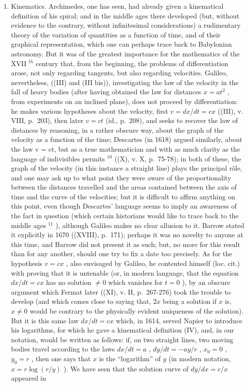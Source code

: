 \begin{enumerate}
\def\labelenumi{\Alph{enumi})}
\setcounter{enumi}{1}
\tightlist
\item
  Kinematics. Archimedes, one has seen, had already given a kinematical definition of his spiral; and in the middle ages there developed (but, without evidence to the contrary, without infinitesimal considerations) a rudimentary theory of the variation of quantities as a function of time, and of their graphical representation, which one can perhaps trace back to Babylonian astronomy. But it was of the greatest importance for the mathematics of the XVII \(^{th}\) century that, from the beginning, the problems of differentiation arose, not only regarding tangents, but also regarding velocities. Galileo, nevertheless, ((III) and (III bis)), investigating the law of the velocity in the fall of heavy bodies (after having obtained the law for distances \(x = at^{2}\) , from experiments on an inclined plane), does not proceed by differentiation: he makes various hypotheses about the velocity, first \(v = dx/dt = cx\) ((III), v. VIII, p.~203), then later \(v = ct\) (id., p.~208), and seeks to recover the law of distances by reasoning, in a rather obscure way, about the graph of the velocity as a function of the time; Descartes (in 1618) argued similarly, about the law v = ct, but as a true mathematician and with as much clarity as the language of indivisibles permits \(^{10}\) ((X), v. X, p.~75-78); in both of these, the graph of the velocity (in this instance a straight line) plays the principal rôle, and one may ask up to what point they were aware of the proportionality between the distances travelled and the areas contained between the axis of time and the curve of the velocities; but it is difficult to affirm anything on this point, even though Descartes' language seems to imply an awareness of the fact in question (which certain historians would like to trace back to the middle ages \(^{11}\) ), although Galileo makes no clear allusion to it. Barrow stated it explicitly in 1670 ((XVIII), p.~171); perhaps it was no novelty to anyone at this time, and Barrow did not present it as such; but, no more for this result than for any another, should one try to fix a date too precisely. As for the hypothesis \(v = cx\) , also envisaged by Galileo, he contented himself (loc. cit.) with proving that it is untenable (or, in modern language, that the equation \(dx/dt = cx\) has no solution \(\neq 0\) which vanishes for \(t = 0\) ), by an obscure argument which Fermat later ((XI), v. II, p.~267-276) took the trouble to develop (and which comes close to saying that, \(2x\) being a solution if \(x\) is, \(x \neq 0\) would be contrary to the physically evident uniqueness of the solution). But it is this same law \(dx/dt = cx\) which, in 1614, served Napier to introduce his logarithms, for which he gave a kinematical definition (IV), and, in our notation, would be written as follows: if, on two straight lines, two moving bodies travel according to the laws \(dx/dt = a\) , \(dy/dt = -ay/r\) , \(x_0 = 0\) , \(y_0 = r\) , then one says that \(x\) is the ``logarithm'' of \(y\) (in modern notation, \(x = r \log(r/y)\) ). We have seen that the solution curve of \(dy/dx = c/x\) appeared in 
\end{enumerate}
